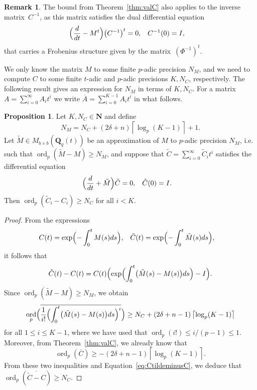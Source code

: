 \documentclass[a4paper,11pt]{article}
\numberwithin{equation}{section}
\providecommand{\ceil}[1]{\left\lceil#1\right\rceil}   %
\newcommand{\NN}{\mathbf{N}} %
\newcommand{\QQ}{\mathbf{Q}} %
\DeclareMathOperator{\ord}{ord}          %
\theoremstyle{definition}
\newtheorem{prop}[thm]{Proposition}
\newtheorem{rem}[thm]{Remark}
\begin{document}
\begin{rem} \label{rem:Cinv}
The bound from Theorem~\ref{thm:valC} 
also applies to the inverse matrix~$C^{-1}$, as this matrix satisfies 
the dual differential equation 
\begin{align} \label{eq:01-GMDE-Dual}
\Bigl(\frac{d}{dt} - M^t\Bigr) \bigl(C^{-1}\bigr)^t &= 0, &C^{-1}(0)& = I,
\end{align}
that carries a Frobenius structure 
given by the matrix~$(\Phi^{-1})^t$.
\end{rem}

We only know the matrix $M$ to some finite $p$-adic precision 
$N_M$, and we need to compute $C$ to some finite $t$-adic and 
$p$-adic precisions $K,N_C$, respectively. The following result gives an 
expression for $N_M$ in terms of $K,N_C$. For a matrix 
$A=\sum_{i=0}^{\infty} A_i t^i$ we write 
$\overline{A}=\sum_{i=0}^{K-1} A_i t^i$ 
in what follows. 

\begin{prop} \label{prop:N_M}
Let $K,N_C \in \NN$ and define
\[
N_M= N_C + (2 \delta + n) \ceil{\log_p(K-1)}+1.
\]
Let $\tilde{M} \in M_{b \times b}(\QQ_q(t))$ be
an approximation of $M$ to $p$-adic precision $N_M$, i.e.
such that $\ord_p(\tilde{M}-M) \geq N_M$, and suppose that 
$\tilde{C}=\sum_{i=0}^{\infty} \tilde{C}_i t^i$ satisfies the
differential equation
\begin{align*}
\Bigl(\frac{d}{dt}+\tilde{M} \Bigr) \tilde{C}&=0, &\tilde{C}(0)=I&.
\end{align*}
Then $\ord_p(\tilde{C}_i-C_i) \geq N_C$ for all $i < K$.
\end{prop}

\begin{proof}
From the expressions
\begin{align*}
C(t)&=\exp\Bigl(- \int_{0}^t M(s) ds\Bigr), &
\tilde{C}(t)&=\exp\Bigl(-\int_{0}^t \tilde{M}(s) ds\Bigr),
\end{align*}
it follows that
\begin{equation} \label{eq:CtildeminusC}
\tilde{C}(t) - C(t) = C(t) \Bigl( \exp \Bigl( \int_{0}^t \bigl( \tilde{M}(s)-M(s) \bigr) ds \Bigr)- I \Bigr).
\end{equation}
Since $\ord_p(\tilde{M}-M) \geq N_M$, we obtain
\begin{equation*}
\ord_p \Bigl( \overline{\frac{1}{i!} \Bigl(\int_{0}^t \bigl( \tilde{M}(s)-M(s) \bigr) ds \Bigr)^i } \Bigr) \geq 
N_C + (2 \delta + n-1) \ceil{\log_p(K-1)}
\end{equation*}
for all $1 \leq i \leq K-1$, where we have used that 
$\ord_p(i!) \leq i/(p-1) \leq 1$. Moreover, from 
Theorem~\ref{thm:valC}, we already know that 
\[
\ord_p(\overline{C}) \geq -(2 \delta + n-1) \ceil{\log_p(K-1)}.
\] 
From these two inequalities and Equation~\eqref{eq:CtildeminusC}, we 
deduce that $\ord_p(\overline{\tilde{C}-C}) \geq N_C$.
\end{proof}
\end{document}

